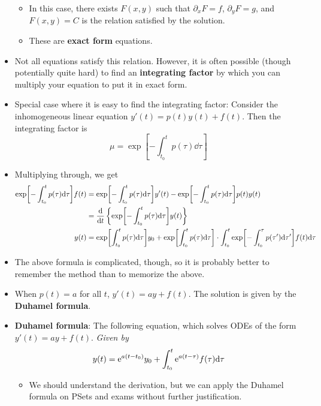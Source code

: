 \documentclass[../notes.tex]{subfiles}
\begin{document}
\begin{itemize}
    \begin{itemize}
        \item In this case, there exists $F(x,y)$ such that $\partial_xF=f$, $\partial_yF=g$, and $F(x,y)=C$ is the relation satisfied by the solution.
        \item These are \textbf{exact form} equations.
    \end{itemize}
    \item Not all equations satisfy this relation. However, it is often possible (though potentially quite hard) to find an \textbf{integrating factor} by which you can multiply your equation to put it in exact form.
    \item Special case where it is easy to find the integrating factor: Consider the inhomogeneous linear equation $y'(t)=p(t)y(t)+f(t)$. Then the integrating factor is
    \begin{equation*}
        \mu = \exp[-\int_{t_0}^tp(\tau)\dd\tau]
    \end{equation*}
    \item Multiplying through, we get
    \begin{align*}
        \exp[-\int_{t_0}^tp(\tau)\dd\tau]f(t) &= \exp[-\int_{t_0}^tp(\tau)\dd\tau]y'(t)-\exp[-\int_{t_0}^tp(\tau)\dd\tau]p(t)y(t)\\
        &= \dv{t}\left\{ \exp[-\int_{t_0}^tp(\tau)\dd\tau]y(t) \right\}\\
        y(t) &= \exp[\int_{t_0}^tp(\tau)\dd\tau]y_0+\exp[\int_{t_0}^tp(\tau)\dd\tau]\cdot\int_{t_0}^t\exp[-\int_{t_0}^\tau p(\tau')\dd\tau']f(t)\dd\tau
    \end{align*}
    \item The above formula is complicated, though, so it is probably better to remember the method than to memorize the above.
    \item When $p(t)=a$ for all $t$, $y'(t)=ay+f(t)$. The solution is given by the \textbf{Duhamel formula}.
    \item \textbf{Duhamel formula}: The following equation, which solves ODEs of the form $y'(t)=ay+f(t)$. \emph{Given by}
    \begin{equation*}
        y(t) = \e[a(t-t_0)]y_0+\int_{t_0}^t\e[a(t-\tau)]f(\tau)\dd\tau
    \end{equation*}
    \begin{itemize}
        \item We should understand the derivation, but we can apply the Duhamel formula on PSets and exams without further justification.
    \end{itemize}

\end{itemize}
\end{document}

